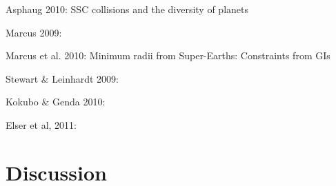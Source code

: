\cite{Asphaug:2010p3539}
Asphaug 2010: SSC collisions and the diversity of planets


\cite{2009ApJ...700L.118M}
Marcus 2009:

\cite{2010ApJ...712L..73M}
Marcus et al. 2010: Minimum radii from Super-Earths: Constraints from GIs

\cite{Stewart:2009p3265}
Stewart \& Leinhardt 2009:

\cite{2010ApJ...714L..21K}
Kokubo \& Genda 2010:

\cite{2011arXiv1105.4616E}
Elser et al, 2011:

\section{Discussion}






